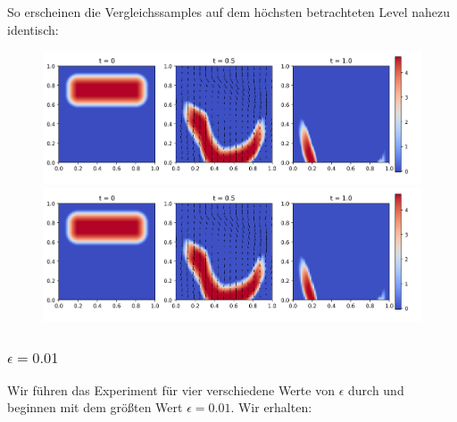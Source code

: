 So erscheinen die Vergleichssamples auf dem höchsten betrachteten Level nahezu identisch:
\begin{figure}[H]
	\centering
	\includegraphics[width=\textwidth]{plots/sample_7_0.png} 
	\includegraphics[width=\textwidth]{plots/sample_coarse_7_0.png} 
\end{figure}
\subsubsection{$ \epsilon=0.01 $}
Wir führen das Experiment für vier verschiedene Werte von $ \epsilon $ durch und beginnen mit dem größten Wert $ \epsilon=0.01 $. Wir erhalten: 



